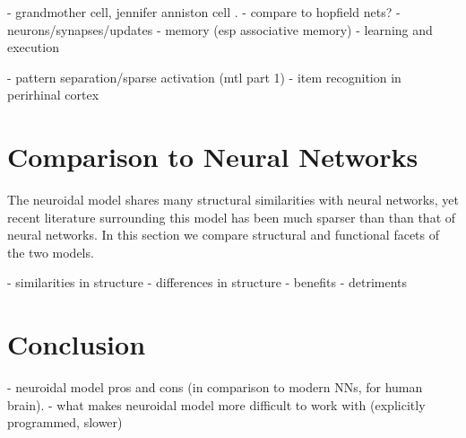 \documentclass[letterpaper, 12pt]{article}
\begin{document}
- grandmother cell,  jennifer anniston cell \cite{quiroga_invariant_2005}.
- compare to hopfield nets?
- neurons/synapses/updates
- memory (esp associative memory)
- learning and execution

- pattern separation/sparse activation (mtl part 1)
- item recognition in perirhinal cortex %

\section{Comparison to Neural Networks}
The neuroidal model shares many structural similarities with neural networks, yet recent literature surrounding this model has been much sparser than than that of neural networks. In this section we compare structural and functional facets of the two models.

- similarities in structure
- differences in structure
- benefits
- detriments

\section{Conclusion}
- neuroidal model pros and cons (in comparison to modern NNs, for human brain).
- what makes neuroidal model more difficult to work with (explicitly programmed, slower)



\end{document}
